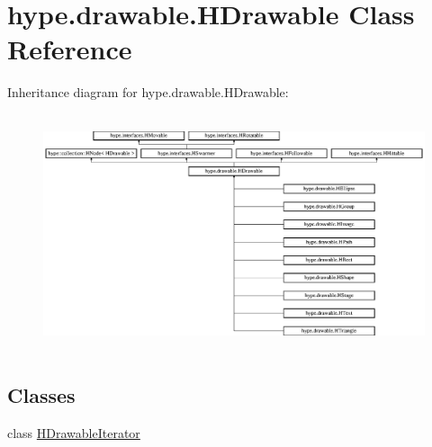 \hypertarget{classhype_1_1drawable_1_1_h_drawable}{\section{hype.\-drawable.\-H\-Drawable Class Reference}
\label{classhype_1_1drawable_1_1_h_drawable}
}
Inheritance diagram for hype.\-drawable.\-H\-Drawable\-:\begin{figure}[H]
\begin{center}
\leavevmode
\includegraphics[height=7.000000cm]{classhype_1_1drawable_1_1_h_drawable}
\end{center}
\end{figure}
\subsection*{Classes}
\begin{DoxyCompactItemize}
\item 
class \hyperlink{classhype_1_1drawable_1_1_h_drawable_1_1_h_drawable_iterator}{H\-Drawable\-Iterator}
\end{DoxyCompactItemize}
